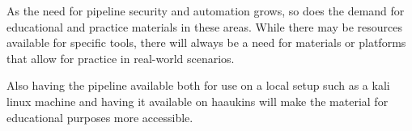 As the need for pipeline security and automation grows, so does the demand for educational and 
practice materials in these areas. While there may be resources available for specific tools, 
there will always be a need for materials or platforms that allow for practice in real-world scenarios. 

Also having the pipeline available both for use on a local setup such as a kali linux machine and 
having it available on haaukins will make the material for educational purposes more accessible.

